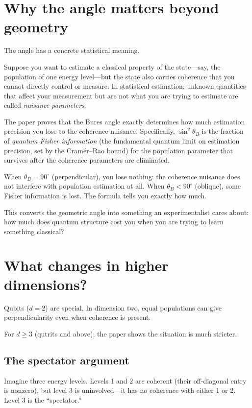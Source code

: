 \documentclass[11pt,a4paper]{article}
\begin{document}
\section*{Why the angle matters beyond geometry}

The angle has a concrete statistical meaning.

Suppose you want to estimate a classical property of the state---say, the population of one energy level---but the state also carries coherence that you cannot directly control or measure.  In statistical estimation, unknown quantities that affect your measurement but are not what you are trying to estimate are called \emph{nuisance parameters}.

The paper proves that the Bures angle exactly determines how much estimation precision you lose to the coherence nuisance.  Specifically, $\sin^2\theta_B$ is the fraction of \emph{quantum Fisher information} (the fundamental quantum limit on estimation precision, set by the Cram\'er--Rao bound) for the population parameter that survives after the coherence parameters are eliminated.

When $\theta_B = 90^\circ$ (perpendicular), you lose nothing: the coherence nuisance does not interfere with population estimation at all.  When $\theta_B < 90^\circ$ (oblique), some Fisher information is lost.  The formula tells you exactly how much.

This converts the geometric angle into something an experimentalist cares about: how much does quantum structure cost you when you are trying to learn something classical?

\section*{What changes in higher dimensions?}

Qubits ($d = 2$) are special.  In dimension two, equal populations can give perpendicularity even when coherence is present.

For $d \geq 3$ (qutrits and above), the paper shows the situation is much stricter.

\subsection*{The spectator argument}

Imagine three energy levels.  Levels 1 and 2 are coherent (their off-diagonal entry is nonzero), but level 3 is uninvolved---it has no coherence with either 1 or 2.  Level 3 is the ``spectator.''
\end{document}
